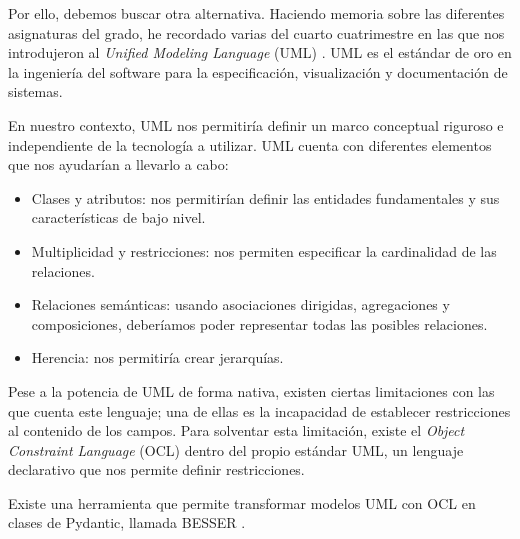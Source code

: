 \documentclass[12pt,a4paper]{article}
\begin{document}
Por ello, debemos buscar otra alternativa. Haciendo memoria sobre las diferentes asignaturas del grado, he recordado varias del cuarto cuatrimestre en las que nos introdujeron al \textit{Unified Modeling Language} (UML) \cite{omg_uml}. UML es el estándar de oro en la ingeniería del software para la especificación, visualización y documentación de sistemas.

En nuestro contexto, UML nos permitiría definir un marco conceptual riguroso e independiente de la tecnología a utilizar. UML cuenta con diferentes elementos que nos ayudarían a llevarlo a cabo:

\begin{itemize}
\item Clases y atributos: nos permitirían definir las entidades fundamentales y sus características de bajo nivel.
\item Multiplicidad y restricciones: nos permiten especificar la cardinalidad de las relaciones.
\item Relaciones semánticas: usando asociaciones dirigidas, agregaciones y composiciones, deberíamos poder representar todas las posibles relaciones.
\item Herencia: nos permitiría crear jerarquías.
\end{itemize}

Pese a la potencia de UML de forma nativa, existen ciertas limitaciones con las que cuenta este lenguaje; una de ellas es la incapacidad de establecer restricciones al contenido de los campos. Para solventar esta limitación, existe el \textit{Object Constraint Language} (OCL) \cite{omg_ocl} dentro del propio estándar UML, un lenguaje declarativo que nos permite definir restricciones.

Existe una herramienta que permite transformar modelos UML con OCL en clases de Pydantic, llamada BESSER \cite{besser_pydantic}.




\newpage

\end{document}
